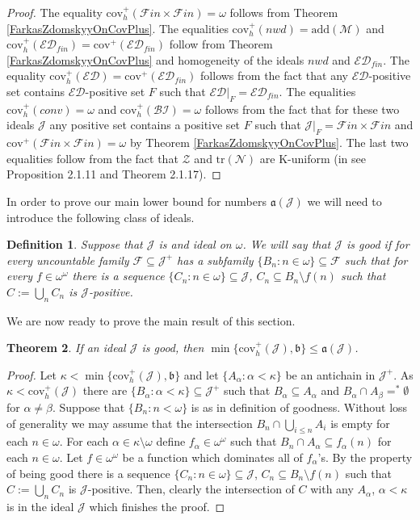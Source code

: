 \documentclass[a4paper]{amsart}
\newtheorem{theorem}{Theorem}[section]
\newtheorem{definition}[theorem]{Definition}
\newcommand{\aaa}{\mathfrak{a}}
\newcommand{\bbb}{\mathfrak{b}}
\newcommand{\Meager}{\mathcal{M}}
\newcommand{\Null}{\mathcal{N}}
\newcommand{\Baire}{\omega^{\omega}}
\newcommand{\add}{\mathrm{add}}
\newcommand{\cov}{\mathrm{cov}}
\newcommand{\J}{\mathcal{J}}
\newcommand{\ED}{\mathcal{ED}}
\newcommand{\FF}{\mathcal{F}in\times\mathcal{F}in}
\newcommand{\nwd}{nwd}
\newcommand{\Z}{\mathcal{Z}}
\newcommand{\conv}{conv}
\newcommand{\trN}{\mathrm{tr}(\Null)}
\newcommand{\BI}{\mathcal{BI}}
\begin{document}
\begin{proof}
    The equality $\cov^{+}_{h}(\FF)=\omega$ follows from Theorem \ref{FarkasZdomskyyOnCovPlus}. The equalities $\cov^{+}_{h}(\nwd)=\add(\Meager)$ and $\cov^{+}_{h}(\ED_{fin})=\cov^{+}(\ED_{fin})$ follow from Theorem \ref{FarkasZdomskyyOnCovPlus} and homogeneity of the ideals $\nwd$ and $\ED_{fin}$. The equality $\cov^{+}_{h}(\ED)=\cov^{+}(\ED_{fin})$ follows from the fact that any $\ED$-positive set contains $\ED$-positive set $F$ such that $\ED|_{F}=\ED_{fin}$. The equalities $\cov^{+}_{h}(\conv)=\omega$ and $\cov^{+}_{h}(\BI)=\omega$ follows from the fact that for these two ideals $\J$ any positive set contains a positive set $F$ such that $\J|_{F}=\FF$ and $\cov^{+}(\FF)=\omega$ by Theorem \ref{FarkasZdomskyyOnCovPlus}. The last two equalities follow from the fact that $\Z$ and $\trN$ are K-uniform (in \cite{Meza} see Proposition 2.1.11 and Theorem 2.1.17).
\end{proof}
In order to prove our main lower bound for numbers $\aaa(\J)$ we will need to introduce the following class of ideals.
\begin{definition}
    Suppose that $\J$ is and ideal on $\omega$. We will say that $\J$ is \emph{good} if for every uncountable family $\mathcal{F}\subseteq\J^+$ has a subfamily $\{B_{n}:n\in\omega\}\subseteq\mathcal{F}$ such that for every $f\in\Baire$ there is a sequence $\{C_{n}:n\in\omega\}\subseteq\J$, $C_{n}\subseteq B_{n}\setminus f(n)$ such that $C:=\bigcup_{n}C_{n}$ is $\J$-positive.
\end{definition}
We are now ready to prove the main result of this section.
\begin{theorem}\label{MAINthmAntichains}
    If an ideal $\J$ is good, then $\min\{\cov^{+}_{h}(\J),\bbb\}\leq\aaa(\J)$.
\end{theorem}
\begin{proof}
    Let $\kappa<\min\{\cov^{+}_{h}(\J),\bbb\}$ and let $\{A_{\alpha}:\alpha<\kappa\}$ be an antichain in $\J^+$. As $\kappa<\cov^{+}_{h}(\J)$ there are $\{B_{\alpha}:\alpha<\kappa\}\subseteq\J^+$ such that $B_{\alpha}\subseteq A_{\alpha}$ and $B_{\alpha}\cap A_{\beta}=^*\emptyset$ for $\alpha\neq\beta$. Suppose that $\{B_{n}:n<\omega\}$ is as in definition of goodness. Without loss of generality we may assume that the intersection $B_{n}\cap\bigcup_{i\leq n}A_{i}$ is empty for each $n\in\omega$. For each $\alpha\in\kappa\setminus\omega$ define $f_{\alpha}\in\Baire$ such that $B_{n}\cap A_{\alpha}\subseteq f_{\alpha}(n)$ for each $n\in\omega$. Let $f\in\Baire$ be a function which dominates all of $f_{\alpha}$'s. By the property of being good there is a sequence $\{C_{n}:n\in\omega\}\subseteq\J$, $C_{n}\subseteq B_{n}\setminus f(n)$ such that $C:=\bigcup_{n}C_{n}$ is $\J$-positive. Then, clearly the intersection of $C$ with any $A_{\alpha}$, $\alpha<\kappa$ is in the ideal $\J$ which finishes the proof.
\end{proof}
\end{document}
